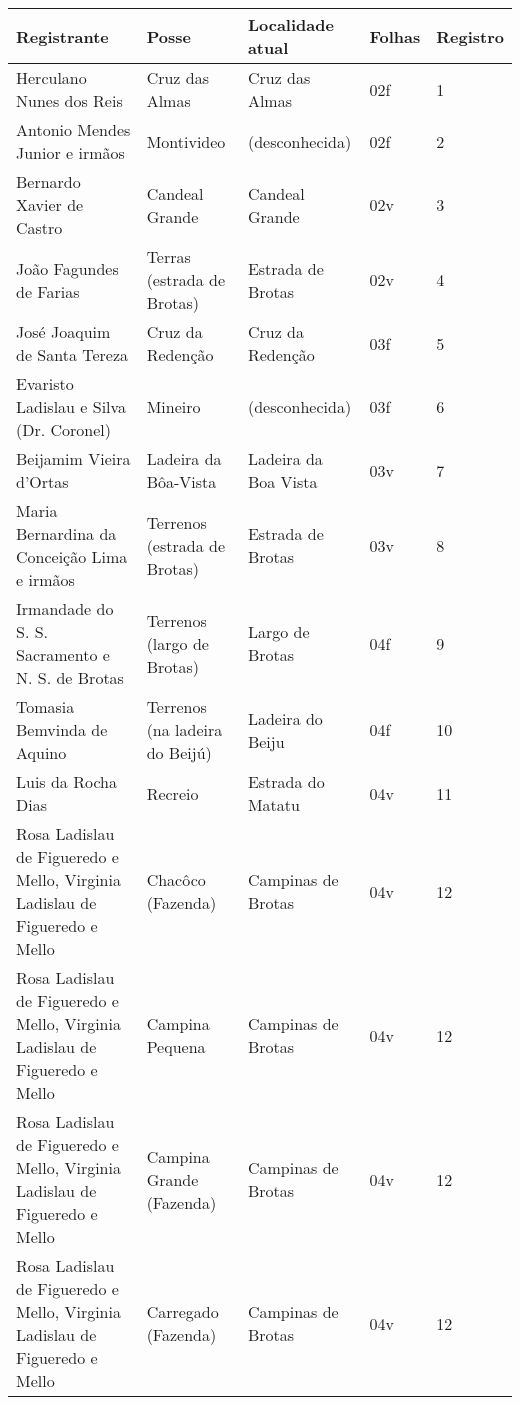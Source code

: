\begin{table}[!htp]
{
\begin{minipage}{\textwidth}
\begin{tiny}
\begin{tabular}{p{4cm}p{4cm}p{4cm}ll}
\toprule
Registrante									&Posse					&Localidade atual			&Folhas			&Registro		\\
\midrule
\midrule
Herculano Nunes dos Reis							&Cruz das Almas				&Cruz das Almas				&02f			&1			\\
Antonio Mendes Junior e irmãos							&Montivideo				&(desconhecida)				&02f			&2			\\
Bernardo Xavier de Castro							&Candeal Grande				&Candeal Grande				&02v			&3			\\
João Fagundes de Farias								&Terras (estrada de Brotas)		&Estrada de Brotas			&02v			&4			\\
José Joaquim de Santa Tereza							&Cruz da Redenção			&Cruz da Redenção			&03f			&5			\\
Evaristo Ladislau e Silva (Dr. Coronel)						&Mineiro				&(desconhecida)				&03f			&6			\\
Beijamim Vieira d'Ortas								&Ladeira da Bôa-Vista			&Ladeira da Boa Vista			&03v			&7			\\
Maria Bernardina da Conceição Lima e irmãos					&Terrenos (estrada de Brotas)		&Estrada de Brotas			&03v			&8			\\
Irmandade do S. S. Sacramento e N. S. de Brotas					&Terrenos (largo de Brotas)		&Largo de Brotas			&04f			&9			\\
Tomasia Bemvinda de Aquino							&Terrenos (na ladeira do Beijú)		&Ladeira do Beiju			&04f			&10			\\
Luis da Rocha Dias 								&Recreio				&Estrada do Matatu			&04v			&11			\\
Rosa Ladislau de Figueredo e Mello, Virginia Ladislau de Figueredo e Mello	&Chacôco (Fazenda)			&Campinas de Brotas			&04v			&12			\\
Rosa Ladislau de Figueredo e Mello, Virginia Ladislau de Figueredo e Mello	&Campina Pequena			&Campinas de Brotas			&04v			&12			\\
Rosa Ladislau de Figueredo e Mello, Virginia Ladislau de Figueredo e Mello	&Campina Grande (Fazenda)		&Campinas de Brotas			&04v			&12			\\
Rosa Ladislau de Figueredo e Mello, Virginia Ladislau de Figueredo e Mello	&Carregado (Fazenda)			&Campinas de Brotas			&04v			&12			\\

\end{tabular}
\end{tiny}
\end{minipage}}
\end{table}

